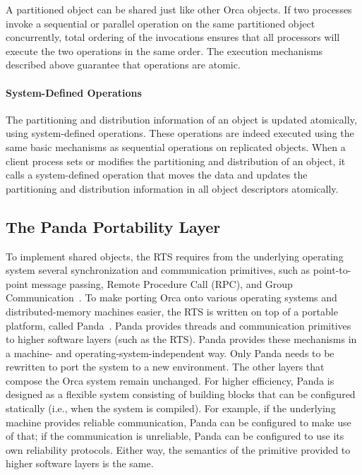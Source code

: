 \documentclass{acmtrans2e}
\begin{document}
A partitioned object can be shared just like other Orca objects. If
two processes invoke a sequential or parallel operation on the same
partitioned object concurrently, total ordering of the invocations
ensures that all processors will execute the two operations in the
same order. The execution mechanisms described above guarantee that
operations are atomic.

\paragraph{System-Defined Operations} 
The partitioning
and distribution information of an object is updated
atomically, using system-defined operations.
These operations are indeed executed using the
same basic mechanisms as sequential operations on replicated
objects. When a client process sets or modifies the partitioning and
distribution of an object, it calls a system-defined operation that
moves the data and updates the partitioning and distribution
information in all object descriptors atomically.

\subsection{The Panda Portability Layer}

To implement shared objects, the RTS requires from the underlying
operating system several synchronization and communication primitives,
such as point-to-point message passing, Remote Procedure Call (RPC), and Group
Communication~\cite{kaashoek93}. To make porting Orca onto various
operating systems and distributed-memory machines easier, the RTS is
written on top of a portable platform, called
Panda~\cite{ruhl96}. Panda provides threads and communication
primitives to higher software layers (such as the RTS). Panda provides
these mechanisms in a machine- and operating-system-independent
way. Only Panda needs to be rewritten to port the system to a new
environment.  The other layers that compose the Orca system remain
unchanged. For higher efficiency, Panda is designed as a flexible
system consisting of building blocks that can be configured statically
(i.e., when the system is compiled). For example, if the underlying
machine provides reliable communication, Panda can be configured to
make use of that; if the communication is unreliable, Panda can be
configured to use its own reliability protocols. Either way, the
semantics of the primitive provided to higher software layers is the
same.
\end{document}
